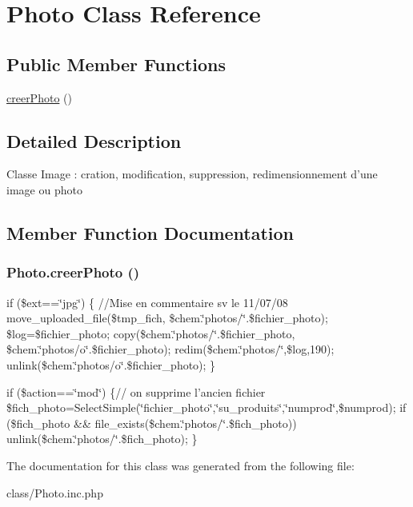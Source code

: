 \hypertarget{class_photo}{
\section{Photo Class Reference}
\label{class_photo}
}
\subsection*{Public Member Functions}
\begin{DoxyCompactItemize}
\item 
\hyperlink{class_photo_a2869de9600843c915faada27c4663062}{creerPhoto} ()
\end{DoxyCompactItemize}


\subsection{Detailed Description}
Classe Image : cration, modification, suppression, redimensionnement d'une image ou photo 

\subsection{Member Function Documentation}
\hypertarget{class_photo_a2869de9600843c915faada27c4663062}{
\subsubsection[{creerPhoto}]{\setlength{\rightskip}{0pt plus 5cm}Photo.creerPhoto ()}}
\label{class_photo_a2869de9600843c915faada27c4663062}


if (\$ext==\char`\"{}jpg\char`\"{}) \{ //Mise en commentaire sv le 11/07/08 move\_\-uploaded\_\-file(\$tmp\_\-fich, \$chem.\char`\"{}photos/\char`\"{}.\$fichier\_\-photo); \$log=\$fichier\_\-photo; copy(\$chem.\char`\"{}photos/\char`\"{}.\$fichier\_\-photo, \$chem.\char`\"{}photos/o\char`\"{}.\$fichier\_\-photo); redim(\$chem.\char`\"{}photos/\char`\"{},\$log,190); unlink(\$chem.\char`\"{}photos/o\char`\"{}.\$fichier\_\-photo); \}

if (\$action==\char`\"{}mod\char`\"{}) \{// on supprime l'ancien fichier \$fich\_\-photo=SelectSimple(\char`\"{}fichier\_\-photo\char`\"{},\char`\"{}su\_\-produits\char`\"{},\char`\"{}numprod\char`\"{},\$numprod); if (\$fich\_\-photo \&\& file\_\-exists(\$chem.\char`\"{}photos/\char`\"{}.\$fich\_\-photo)) unlink(\$chem.\char`\"{}photos/\char`\"{}.\$fich\_\-photo); \} 

The documentation for this class was generated from the following file:\begin{DoxyCompactItemize}
\item 
class/Photo.inc.php\end{DoxyCompactItemize}
